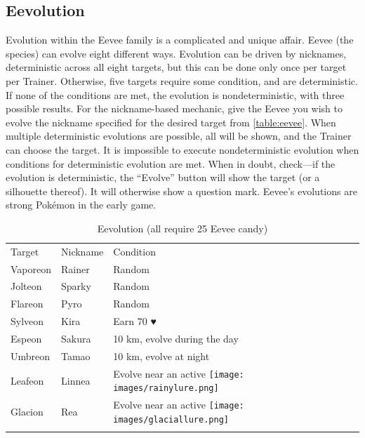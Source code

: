 \subsection{Eevolution}
\begin{figure}
\end{figure}
Evolution within the Eevee family is a complicated and unique affair.
Eevee (the species) can evolve eight different ways.
Evolution can be driven by nicknames, deterministic across all eight targets,
  but this can be done only once per target per Trainer.
Otherwise, five targets require some condition, and are deterministic.
If none of the conditions are met, the evolution is nondeterministic,
  with three possible results.
For the nickname-based mechanic, give the Eevee you wish to evolve the nickname
  specified for the desired target from \autoref{table:eevee}.
When multiple deterministic evolutions are possible, all will be shown,
  and the Trainer can choose the target.
It is impossible to execute nondeterministic evolution when conditions for deterministic evolution are met.
When in doubt, check---if the evolution is deterministic, the ``Evolve'' button will show the target (or a silhouette thereof).
It will otherwise show a question mark.
Eevee's evolutions are strong Pokémon in the early game.
\begin{table}
\footnotesize
\centering
\begin{tabular}{lll}
  Target & Nickname & Condition\\
  \Midrule
  Vaporeon & Rainer & Random\\
  Jolteon & Sparky & Random\\
  Flareon & Pyro & Random\\
  Sylveon & Kira & Earn 70 ♥ \\
  Espeon & Sakura & 10 km, evolve during the day\\
  Umbreon & Tamao & 10 km, evolve at night\\
  Leafeon & Linnea & Evolve near an active \texttt{[image: images/rainylure.png]} \\
  Glacion & Rea & Evolve near an active \texttt{[image: images/glaciallure.png]} \\\\
\end{tabular}
\caption{Eevolution (all require 25 Eevee candy)\label{table:eevee}}
\end{table}


